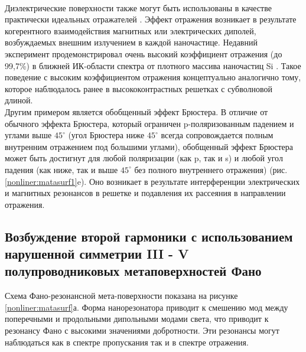 \\
\hspace*{2mm}
Диэлектрические поверхности также могут быть использованы в качестве практически идеальных отражателей \cite{moitra2015large}.  Эффект отражения возникает в результате когерентного взаимодействия магнитных или электрических диполей, возбуждаемых внешним излучением в каждой наночастице. Недавний эксперимент продемонстрировал очень высокий коэффициент отражения (до 99,7\%) в ближней ИК-области спектра от плотного массива наночастиц Si \cite{moitra2015large}. Такое поведение с высоким коэффициентом отражения концептуально аналогично тому, которое наблюдалось ранее в высококонтрастных решетках с субволновой длиной. 
\\
\hspace*{2mm}
Другим примером является обобщенный эффект Брюстера. В отличие от обычного эффекта Брюстера, который ограничен p-поляризованным падением и углами выше $45^\circ$ (угол Брюстера ниже $45^\circ$ всегда сопровождается полным внутренним отражением под большими углами), обобщенный эффект Брюстера может быть достигнут для любой поляризации (как p, так и s) и любой угол падения (как ниже, так и выше $45^\circ$ без полного внутреннего отражения) (рис. \ref{nonliner:matasurf1}e). Оно возникает в результате интерференции электрических и магнитных резонансов в решетке и подавления их рассеяния в направлении отражения.

\subsection*{Возбуждение второй гармоники с использованием нарушенной симметрии III - V полупроводниковых метаповерхностей Фано}

\hspace*{2mm}
Схема Фано-резонансной мета-поверхности показана на рисунке  \ref{nonliner:matasurf}а. Форма нанорезонатора приводит к смешению мод между поперечными и продольными дипольными модами света, что приводит к резонансу Фано с высокими значениями добротности. Эти резонансы могут наблюдаться как в спектре  пропускания так и в спектре отражения.

